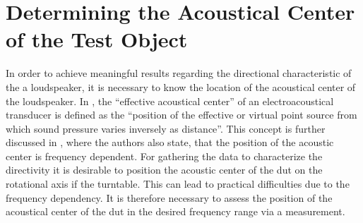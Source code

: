 \section{Determining the Acoustical Center of the Test Object}\label{sec:ac_center}
In order to achieve meaningful results regarding the directional characteristic of the a loudspeaker, it is necessary to know the location of the  acoustical center of the loudspeaker.
In \citep{ansis1.1}, the ``effective acoustical center'' of an electroacoustical transducer is defined as the ``position of the effective or virtual point source from which sound pressure varies inversely as distance''. This concept is further discussed in \citep{jacobsenetal}, where the authors also state, that the position of the acoustic center is frequency dependent. For gathering the data to characterize the directivity it is desirable to position the acoustic center of the \gls{dut} on the rotational axis if the turntable. This can lead to practical difficulties due to the frequency dependency. It is therefore necessary to assess the position of the acoustical center of the \gls{dut} in the desired frequency range via a measurement.

